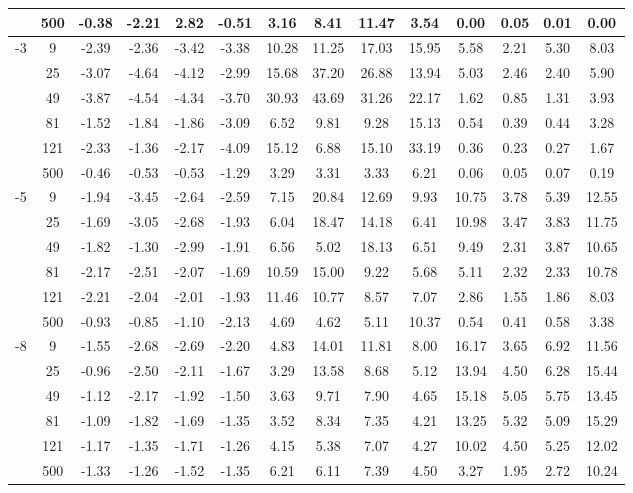 \documentclass[onecolumn]{svjour3}
\begin{document}
\begin{table}[htbp]
\begin{tabular}{cc c*3{S[table-format=3.2]}  c*3{S[table-format=3.2]} c*3{S[table-format=3.2]}}
		& 500   & -0.38 & -2.21 & 2.82  & -0.51 & 3.16  & 8.41  & 11.47 & 3.54  & 0.00  & 0.05  & 0.01  & 0.00 \\
		\midrule
		[2]{*}{-3} & 9     & -2.39 & -2.36 & -3.42 & -3.38 & 10.28 & 11.25 & 17.03 & 15.95 & 5.58  & 2.21  & 5.30  & 8.03 \\
		& 25    & -3.07 & -4.64 & -4.12 & -2.99 & 15.68 & 37.20 & 26.88 & 13.94 & 5.03  & 2.46  & 2.40  & 5.90 \\
		& 49    & -3.87 & -4.54 & -4.34 & -3.70 & 30.93 & 43.69 & 31.26 & 22.17 & 1.62  & 0.85  & 1.31  & 3.93 \\
		& 81    & -1.52 & -1.84 & -1.86 & -3.09 & 6.52  & 9.81  & 9.28  & 15.13 & 0.54  & 0.39  & 0.44  & 3.28 \\
		& 121   & -2.33 & -1.36 & -2.17 & -4.09 & 15.12 & 6.88  & 15.10 & 33.19 & 0.36  & 0.23  & 0.27  & 1.67 \\
		& 500   & -0.46 & -0.53 & -0.53 & -1.29 & 3.29  & 3.31  & 3.33  & 6.21  & 0.06  & 0.05  & 0.07  & 0.19 \\
		\midrule
		[2]{*}{-5} & 9     & -1.94 & -3.45 & -2.64 & -2.59 & 7.15  & 20.84 & 12.69 & 9.93  & 10.75 & 3.78  & 5.39  & 12.55 \\
		& 25    & -1.69 & -3.05 & -2.68 & -1.93 & 6.04  & 18.47 & 14.18 & 6.41  & 10.98 & 3.47  & 3.83  & 11.75 \\
		& 49    & -1.82 & -1.30 & -2.99 & -1.91 & 6.56  & 5.02  & 18.13 & 6.51  & 9.49  & 2.31  & 3.87  & 10.65 \\
		& 81    & -2.17 & -2.51 & -2.07 & -1.69 & 10.59 & 15.00 & 9.22  & 5.68  & 5.11  & 2.32  & 2.33  & 10.78 \\
		& 121   & -2.21 & -2.04 & -2.01 & -1.93 & 11.46 & 10.77 & 8.57  & 7.07  & 2.86  & 1.55  & 1.86  & 8.03 \\
		& 500   & -0.93 & -0.85 & -1.10 & -2.13 & 4.69  & 4.62  & 5.11  & 10.37 & 0.54  & 0.41  & 0.58  & 3.38 \\
		\midrule
		[2]{*}{-8} & 9     & -1.55 & -2.68 & -2.69 & -2.20 & 4.83  & 14.01 & 11.81 & 8.00  & 16.17 & 3.65  & 6.92  & 11.56 \\
		& 25    & -0.96 & -2.50 & -2.11 & -1.67 & 3.29  & 13.58 & 8.68  & 5.12  & 13.94 & 4.50  & 6.28  & 15.44 \\
		& 49    & -1.12 & -2.17 & -1.92 & -1.50 & 3.63  & 9.71  & 7.90  & 4.65  & 15.18 & 5.05  & 5.75  & 13.45 \\
		& 81    & -1.09 & -1.82 & -1.69 & -1.35 & 3.52  & 8.34  & 7.35  & 4.21  & 13.25 & 5.32  & 5.09  & 15.29 \\
		& 121   & -1.17 & -1.35 & -1.71 & -1.26 & 4.15  & 5.38  & 7.07  & 4.27  & 10.02 & 4.50  & 5.25  & 12.02 \\
		& 500   & -1.33 & -1.26 & -1.52 & -1.35 & 6.21  & 6.11  & 7.39  & 4.50  & 3.27  & 1.95  & 2.72  & 10.24 \\
		\bottomrule
	\end{tabular}%
	\label{tab:addlabel}%
\end{table}%
\end{document}
